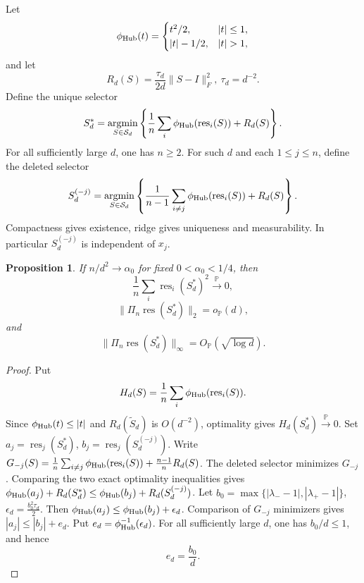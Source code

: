 \documentclass[11pt]{article}
\numberwithin{equation}{section}
\newtheorem{proposition}[theorem]{Proposition}
\theoremstyle{definition}
\theoremstyle{remark}
\newcommand{\Pp}{\mathbb P}
\newcommand{\1}{\boldsymbol 1}
\newcommand{\PiZero}{\Pi_n}
\newcommand{\res}{\operatorname{res}}
\newcommand{\rvec}{\res}
\newcommand{\rentry}[1]{\res_{#1}}
\begin{document}
\begin{aiblock}  

Let
\[
  \phi_{\rm Hub}(t)=
  \begin{cases}
    t^2/2,&|t|\le1,\\
    |t|-1/2,&|t|>1,
  \end{cases}
\]
and let
\[
  R_d(S)=\frac{\tau_d}{2d}\|S-I\|_F^2,
  \ \tau_d=d^{-2}.
\]
Define the unique selector
\[
  S_d^*=\operatorname*{argmin}_{S\in\mathcal S_d}
  \left\{\frac1n\sum_i\phi_{\rm Hub}(\rentry{i}(S))
  +R_d(S)\right\}.
\]
For all sufficiently large $d$, one has $n\geq2$. For such
$d$ and each $1\leq j\leq n$, define the deleted selector
\[
  S_d^{(-j)}=\operatorname*{argmin}_{S\in\mathcal S_d}
  \left\{\frac1{n-1}\sum_{i\ne j}
  \phi_{\rm Hub}(\rentry{i}(S))+R_d(S)\right\}.
\]
Compactness gives existence, ridge gives
uniqueness and measurability. In particular
$S_d^{(-j)}$ is independent of $x_j$.

\begin{proposition}
\label{main-proposition-3-1}
  If $n/d^2\to\alpha_0$ for fixed
  $0<\alpha_0<1/4$, then
  \[
    \frac1n\sum_i\rentry{i}(S_d^*)^2
    \xrightarrow{\Pp}0,
  \]
  \[
    \|\PiZero\rvec(S_d^*)\|_2=o_{\Pp}(d),
  \]
  and
  \[
    \|\PiZero\rvec(S_d^*)\|_\infty
    =O_{\Pp}(\sqrt{\log d}).
  \]
\end{proposition}

\begin{proof}
  Put
  \[
    H_d(S)=\frac1n\sum_i\phi_{\rm Hub}(\rentry{i}(S)).
  \]
  Since $\phi_{\rm Hub}(t)\le|t|$ and
  $R_d(\widetilde S_d)$ is $O(d^{-2})$, optimality
  gives $H_d(S_d^*)\xrightarrow{\Pp}0$.
  Set $a_j=\rentry{j}(S_d^*)$,
  $b_j=\rentry{j}(S_d^{(-j)})$. Write
  $G_{-j}(S)=\frac1n\sum_{i\ne j}\phi_{\rm Hub}(\rentry{i}(S))+\frac{n-1}{n}R_d(S)$.
  The deleted selector minimizes $G_{-j}$. Comparing
  the two exact optimality inequalities gives
  $\phi_{\rm Hub}(a_j)+R_d(S_d^*)\le\phi_{\rm Hub}(b_j)+R_d(S_d^{(-j)})$.
  Let
  $b_0=\max\{|\lambda_--1|,|\lambda_+-1|\}$,
  $\epsilon_d=\frac{b_0^2\tau_d}{2}$.
  Then $\phi_{\rm Hub}(a_j)\le\phi_{\rm Hub}(b_j)+\epsilon_d$.
  Comparison of
  $G_{-j}$ minimizers gives
  $|a_j|\le|b_j|+e_d$. Put
  $e_d=\phi_{\rm Hub}^{-1}(\epsilon_d)$. For all
  sufficiently large $d$, one has $b_0/d\leq1$, and
  hence
  \[
    e_d=\frac{b_0}{d}.
  \]


\end{proof}
\end{aiblock}
\end{document}
